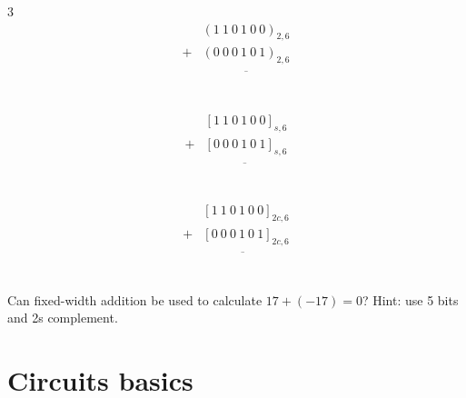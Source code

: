 \documentclass[12pt, oneside]{article}
\begin{document}

\vfill

\begin{multicols}{3}
   \begin{align*}
      & (1~ 1~ 0~ 1~ 0~ 0)_{2,6}\\
   + & (0~ 0~ 0~ 1~ 0~ 1)_{2,6}\\
   &\overline{\phantom{(1~1~1~0~0~1)_{2,6}}}\\
   \end{align*}
   
   \begin{align*}
      & [1~ 1~ 0~ 1~ 0~ 0]_{s,6}\\
   + & [0~ 0~ 0~ 1~ 0~ 1]_{s,6}\\
   &\overline{\phantom{(1~1~1~0~0~1)_2}}\\
   \end{align*}
   
   \begin{align*}
      & [1~ 1~ 0~ 1~ 0~ 0]_{2c,6}\\
   + & [0~ 0~ 0~ 1~ 0~ 1]_{2c,6}\\
   &\overline{\phantom{(1~1~1~0~0~1)_2}}\\
   \end{align*}
\end{multicols}
\vfill

Can fixed-width addition be used to calculate $17 + (-17) = 0$?
Hint: use 5 bits and 2s complement.

\vfill


\newpage \vfill
\section*{Circuits basics}
\end{document}

